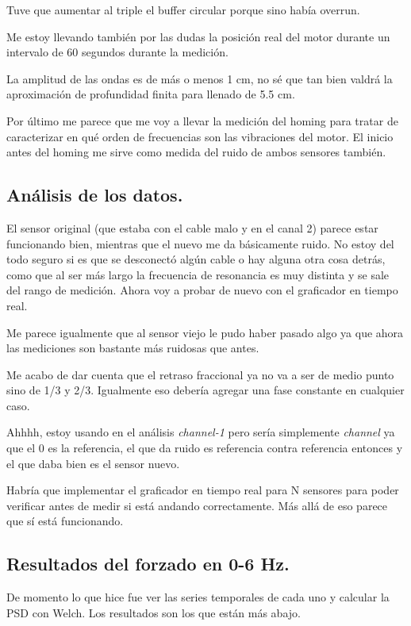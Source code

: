 Tuve que aumentar al triple el buffer circular porque sino había overrun. 

Me estoy llevando también por las dudas la posición real del motor durante un intervalo de 60 segundos durante la medición. 

La amplitud de las ondas es de más o menos 1 cm, no sé que tan bien valdrá la aproximación de profundidad finita para llenado de 5.5 cm.   

Por último me parece que me voy a llevar la medición del homing para tratar de caracterizar en qué orden de frecuencias son las vibraciones del motor. El inicio antes del homing me sirve como medida del ruido de ambos sensores también.   


\subsection*{Análisis de los datos.} 
El sensor original (que estaba con el cable malo y en el canal 2) parece estar funcionando bien, mientras que el nuevo me da básicamente ruido. No estoy del todo seguro si es que se desconectó algún cable o hay alguna otra cosa detrás, como que al ser más largo la frecuencia de resonancia es muy distinta y se sale del rango de medición. Ahora voy a probar de nuevo con el graficador en tiempo real. 

Me parece igualmente que al sensor viejo le pudo haber pasado algo ya que ahora las mediciones son bastante más ruidosas que antes. 

Me acabo de dar cuenta que el retraso fraccional ya no va a ser de medio punto sino de 1/3 y 2/3. Igualmente eso debería agregar una fase constante en cualquier caso. 

Ahhhh, estoy usando en el análisis \textit{channel-1} pero sería simplemente \textit{channel} ya que el 0 es la referencia, el que da ruido es referencia contra referencia entonces y el que daba bien es el sensor nuevo. 

Habría que implementar el graficador en tiempo real para N sensores para poder verificar antes de medir si está andando correctamente. Más allá de eso parece que sí está funcionando. 

\subsection*{Resultados del forzado en 0-6 Hz.} 
De momento lo que hice fue ver las series temporales de cada uno y calcular la PSD con Welch. Los  resultados son los que están más abajo. 

